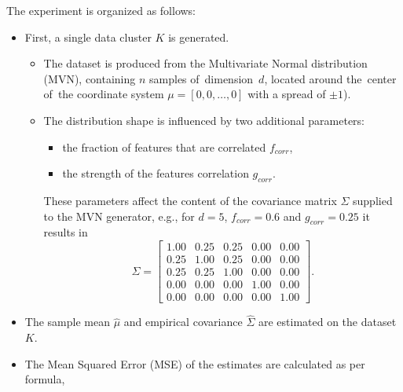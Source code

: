 The experiment is organized as follows:
\vspace{-0.5\baselineskip}
\begin{itemize}
    \item First, a single data cluster $K$ is generated.
          \begin{itemize}
              \item The dataset is produced from the Multivariate Normal distribution (MVN), containing $n$ samples of~dimension~$d$, located around the~center of~the coordinate system $\mu = [0, 0, \dots, 0]$ with a spread of $\pm 1$).
              \item The distribution shape is influenced by two additional parameters:
                    \begin{itemize}
                        \item the fraction of features that are correlated $f_{corr}$,
                        \item the strength of the features correlation $g_{corr}$.
                    \end{itemize}
                    These parameters affect the content of the covariance matrix $\Sigma$ supplied to the MVN generator, e.g., for $d = 5$, $f_{corr} = 0.6$ and $g_{corr} = 0.25$ it results in
                    \begin{equation}
                        \Sigma
                        =
                        \begin{bmatrix}
                            \mathbf{1.00} & \mathbf{0.25} & \mathbf{0.25} & 0.00 & 0.00 \\
                            \mathbf{0.25} & \mathbf{1.00} & \mathbf{0.25} & 0.00 & 0.00 \\
                            \mathbf{0.25} & \mathbf{0.25} & \mathbf{1.00} & 0.00 & 0.00 \\
                            0.00 & 0.00 & 0.00 & \mathbf{1.00} & 0.00 \\
                            0.00 & 0.00 & 0.00 & 0.00 & \mathbf{1.00}
                        \end{bmatrix}
                        .
                        \label{eq:corr-example-2}
                    \end{equation}
          \end{itemize}
    \item The sample mean $\hat{\mu}$ and empirical covariance $\hat{\Sigma}$ are estimated on the dataset $K$.
    \item The Mean Squared Error (MSE) of the estimates are calculated as per formula,

\end{itemize}
